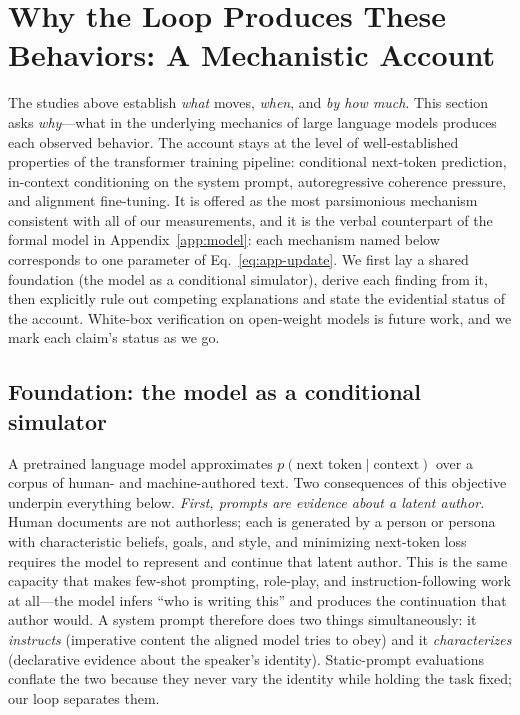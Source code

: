 \section{Why the Loop Produces These Behaviors: A Mechanistic Account}
\label{app:why}

The studies above establish \emph{what} moves, \emph{when}, and \emph{by how much}. This section asks \emph{why}---what in the underlying mechanics of large language models produces each observed behavior. The account stays at the level of well-established properties of the transformer training pipeline: conditional next-token prediction, in-context conditioning on the system prompt, autoregressive coherence pressure, and alignment fine-tuning. It is offered as the most parsimonious mechanism consistent with all of our measurements, and it is the verbal counterpart of the formal model in Appendix~\ref{app:model}: each mechanism named below corresponds to one parameter of Eq.~\eqref{eq:app-update}. We first lay a shared foundation (the model as a conditional simulator), derive each finding from it, then explicitly rule out competing explanations and state the evidential status of the account. White-box verification on open-weight models is future work, and we mark each claim's status as we go.

\subsection{Foundation: the model as a conditional simulator}
A pretrained language model approximates $p(\text{next token}\mid \text{context})$ over a corpus of human- and machine-authored text. Two consequences of this objective underpin everything below. \emph{First, prompts are evidence about a latent author.} Human documents are not authorless; each is generated by a person or persona with characteristic beliefs, goals, and style, and minimizing next-token loss requires the model to represent and continue that latent author. This is the same capacity that makes few-shot prompting, role-play, and instruction-following work at all---the model infers ``who is writing this'' and produces the continuation that author would. A system prompt therefore does two things simultaneously: it \emph{instructs} (imperative content the aligned model tries to obey) and it \emph{characterizes} (declarative evidence about the speaker's identity). Static-prompt evaluations conflate the two because they never vary the identity while holding the task fixed; our loop separates them.

